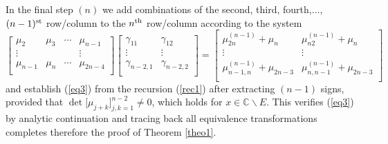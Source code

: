 \documentclass[10pt,oneside,reqno]{amsart}
\numberwithin{equation}{section}
\def\eqref#1{(\ref{#1})}
\begin{document}
In the final step $(n)$ we add combinations of the second, third, fourth,$\ldots$,$(n-1)^{\textnormal{st}}$ row/column to the $n^{\textnormal{th}}$ row/column according to the
system
\begin{equation*}
  \begin{bmatrix}
   \mu_2 & \mu_3 & \cdots & \mu_{n-1}\\
  \vdots & & & \vdots\\
  \mu_{n-1} & \mu_{n} &\cdots & \mu_{2n-4}\\
  \end{bmatrix}\begin{bmatrix}
  \gamma_{11} & \gamma_{12}\\
  \vdots & \vdots\\
  \gamma_{n-2,1} & \gamma_{n-2,2} \\
  \end{bmatrix} = \begin{bmatrix}
  \mu_{2n}^{(n-1)}+\mu_n & \mu_{n2}^{(n-1)}+\mu_n\\
  \vdots & \vdots\\
  \mu_{n-1,n}^{(n-1)} +\mu_{2n-3} & \mu_{n,n-1}^{(n-1)}+\mu_{2n-3}\\
  \end{bmatrix}
\end{equation*}
and establish \eqref{eq3} from the recursion \eqref{rec1} after extracting $(n-1)$ signs, provided that $\det\big[\mu_{j+k}\big]_{j,k=1}^{n-2}\neq 0$, which holds
for $x\in\mathbb{C}\backslash E$. This verifies \eqref{eq3} by analytic continuation and tracing back
all equivalence transformations completes therefore the proof of Theorem \ref{theo1}.

\end{document}
